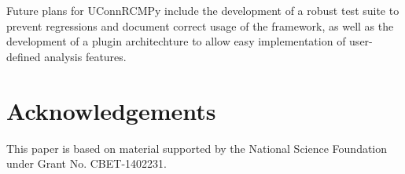 \documentclass[12pt]{../ussci}
\begin{document}
Future plans for UConnRCMPy include the development of a robust test suite to
prevent regressions and document correct usage of the framework, as well as the
development of a plugin architechture to allow easy implementation of
user-defined analysis features.

\section{Acknowledgements}\label{acknowledgements}

This paper is based on material supported by the National Science
Foundation under Grant No. CBET-1402231.

\printbibliography
\end{document}
